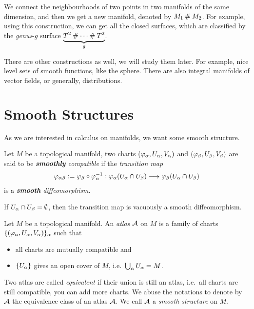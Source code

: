 \begin{example}
  We connect the neighbourhoods of two points in two manifolds of the same dimension, and then we get a new manifold, denoted by \(M_1\mathbin{\#} M_2\). For example, using this construction, we can get all the closed surfaces, which are classified by the \emph{genus}-\(g\) surface \(\underbrace{T^2\mathbin{\#}\cdots\mathbin{\#} T^2}_g\).
\end{example}

There are other constructions as well, we will study them later. For example, nice level sets of smooth functions, like the sphere. There are also integral manifolds of vector fields, or generally, distributions.

\section{Smooth Structures}
As we are interested in calculus on manifolds, we want some smooth structure.
\begin{definition}
  Let \(M\) be a topological manifold, two charts \((\varphi_\alpha,U_\alpha,V_\alpha)\) and \((\varphi_\beta,U_\beta,V_\beta)\) are said to be \emph{\textbf{smoothly} compatible} if the \emph{transition map} \[
    \varphi_{\alpha\beta} := \varphi_\beta\circ\varphi_\alpha^{-1}: \varphi_\alpha(U_\alpha\cap U_\beta) \longrightarrow \varphi_\beta(U_\alpha\cap U_\beta)
  \] is a \emph{\textbf{smooth} diffeomorphism}.
\end{definition}

\begin{center}
  
\end{center}

If \(U_\alpha\cap U_\beta = \emptyset\), then the transition map is vacuously a smooth diffeomorphism.

\begin{definition}[atlas]
  Let \(M\) be a topological manifold. An \emph{atlas} \(\mathcal{A}\) on \(M\) is a family of charts \(\{(\varphi_\alpha,U_\alpha,V_\alpha)\}_\alpha\) such that \begin{itemize}
    \item all charts are mutually compatible and
    \item \(\{U_\alpha\}\) gives an open cover of \(M\), i.e.\ \(\bigcup_\alpha U_\alpha = M\).
  \end{itemize}

  Two atlas are called \emph{equivalent} if their union is still an atlas, i.e.\ all charts are still compatible, you can add more charts. We abuse the notations to denote by \(\mathcal{A}\) the equivalence class of an atlas \(\mathcal{A}\). We call \(\mathcal{A}\) a \emph{smooth structure} on \(M\).
\end{definition}

